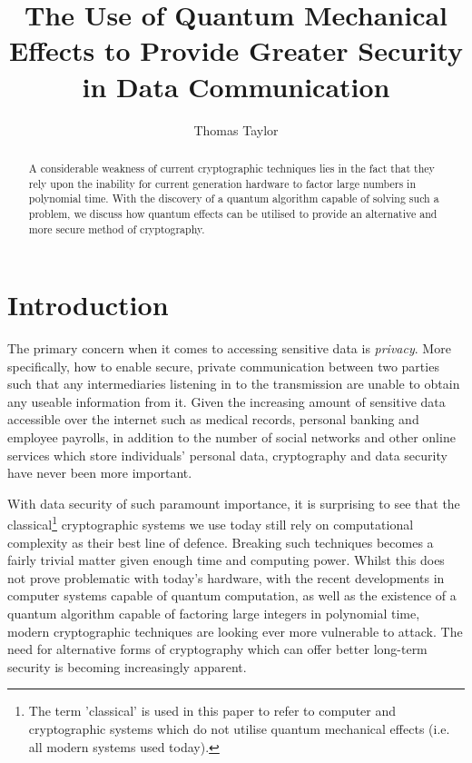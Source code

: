 \documentclass[runningheads,a4paper]{llncs}
\begin{document}
\mainmatter  

\title{The Use of Quantum Mechanical Effects to Provide Greater Security in Data Communication}
\author{Thomas Taylor\\ \mail}

\maketitle

\begin{abstract}
A considerable weakness of current cryptographic techniques lies in the fact that they rely upon the inability for current generation hardware to factor large numbers in polynomial time. With the discovery of a quantum algorithm capable of solving such a problem, we discuss how quantum effects can be utilised to provide an alternative and more secure method of cryptography.

\end{abstract}

\section{Introduction}

The primary concern when it comes to accessing sensitive data is \emph{privacy}. More specifically, how to enable secure, private communication between two parties such that any intermediaries listening in to the transmission are unable to obtain any useable information from it\cite{Rivest:1990fk}. Given the increasing amount of sensitive data accessible over the internet such as medical records, personal banking and employee payrolls, in addition to the number of social networks and other online services which store individuals' personal data, cryptography and data security have never been more important.

With data security of such paramount importance, it is surprising to see that the classical\footnote[1]{The term 'classical' is used in this paper to refer to computer and cryptographic systems which do not utilise quantum mechanical effects (i.e. all modern systems used today).} cryptographic systems we use today still rely on computational complexity as their best line of defence. Breaking such techniques becomes a fairly trivial matter given enough time and computing power. Whilst this does not prove problematic with today's hardware, with the recent developments in computer systems capable of quantum computation\cite{Lu:2007uq}, as well as the existence of a quantum algorithm capable of factoring large integers in polynomial time\cite{Shor:1994fk}, modern cryptographic techniques are looking ever more vulnerable to attack. The need for alternative forms of cryptography which can offer better long-term security is becoming increasingly apparent.
\end{document}
